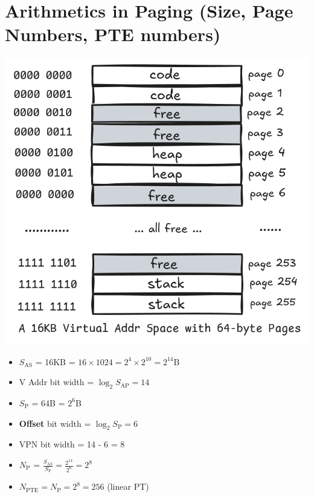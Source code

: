 \section*{Arithmetics in Paging (Size, Page Numbers, PTE numbers)}
\begin{minipage}{0.55\linewidth}
  \includegraphics[width=\linewidth]{imgs/virtual_addr_eg}
  \flushleft
  \begin{itemize}
  \item $S_{\text{AS}}$ = 16KB = $16 \times 1024 = 2^{4} \times 2^{10} = 2 ^{14}$B
  \item V Addr bit width = $\log_2 S_{\text{AP}} = 14$
  \item $S_{\text{P}}$ = 64B = $2^{6}$B
  \item \textbf{Offset} bit width = $\log_2 S_{\text{P}} = 6$
  \item VPN bit width = 14 - 6 = 8
  \item $N_{\text{P}}$ = $\frac{S_{\text{AS}}}{S_{\text{P}}} = \frac{2^{14}}{2^{6}} = 2^{8}$
  \item $N_{\text{PTE}} = N_{\text{P}} = 2^{8} = 256$ (linear PT)
  \end{itemize}
\end{minipage}
